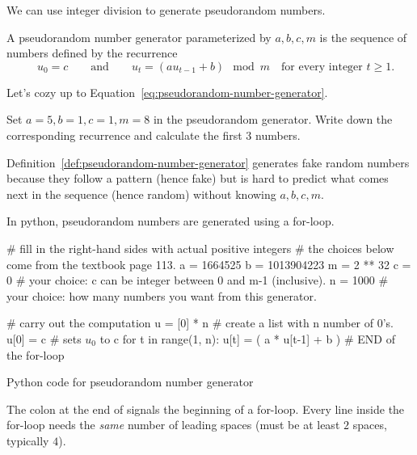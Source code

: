 \documentclass[../main.tex]{subfiles}
\begin{document}
We can use integer division to generate pseudorandom numbers. 
\begin{definition} \label{def:pseudorandom-number-generator}
  A pseudorandom number generator parameterized by \(a,b,c,m\) is the sequence of numbers defined by the recurrence
  \begin{equation} \label{eq:pseudorandom-number-generator}
    \quad u_{0} = c \qquad\text{and}\qquad u_{t} = (a u_{t-1} + b) \mod m \quad\text{for every integer \(t \ge 1\)}.
  \end{equation}
\end{definition}

Let's cozy up to Equation~\ref{eq:pseudorandom-number-generator}.
\begin{example}
  Set \(a = 5, b = 1, c = 1, m = 8\) in the pseudorandom generator. Write down the corresponding recurrence and calculate the first \(3\) numbers. 

\end{example}
\clearpage

Definition~\ref{def:pseudorandom-number-generator} generates fake random numbers because they follow a pattern (hence fake) but is hard to predict what comes next in the sequence (hence random) without knowing \(a,b,c,m\).

In python, pseudorandom numbers are generated using a for-loop.

\begin{listing}[h!]
  \begin{pythoncode}
# fill in the right-hand sides with actual positive integers
# the choices below come from the textbook page 113.
a = 1664525 
b = 1013904223
m = 2 ** 32
c = 0            # your choice: c can be integer between 0 and m-1 (inclusive).
n = 1000         # your choice: how many numbers you want from this generator.

# carry out the computation
u = [0] * n      # create a list with n number of 0's.
u[0] = c         # sets $u_{0}$ to c
for t in range(1, n): 
    u[t] = ( a * u[t-1] + b ) %
# END of the for-loop
  \end{pythoncode}

  \caption{Python code for pseudorandom number generator}
  \label{lst:pseudorandom-number-generator}
\end{listing}

\faExclamationTriangle{} The colon at the end of  signals the beginning of a for-loop. Every line inside the for-loop needs the \emph{same} number of leading spaces (must be at least \(2\) spaces, typically \(4\)).
\end{document}

